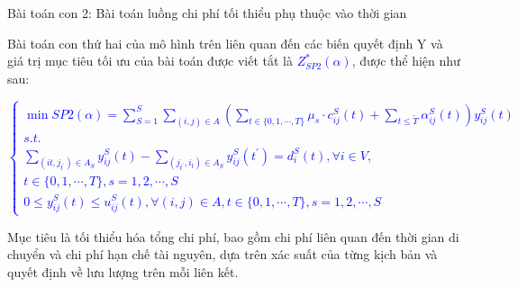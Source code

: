 \documentclass[a4paper]{article}
\begin{document}
Bài toán con 2: Bài toán luồng chi phí tối thiểu phụ thuộc vào thời gian 

Bài toán con thứ hai của mô hình trên liên quan đến các biến quyết định Y và giá trị mục tiêu tối ưu của bài toán được viết tắt là \textcolor{blue}{$Z^*_{SP2} (\alpha)$}, được thể hiện như sau: 

\textcolor{blue}{$\left\{\begin{array}{l}\min S P 2(\alpha)=\sum_{S=1}^S \sum_{(i, j) \in A}\left(\sum_{t \in\{0,1, \cdots, T\}} \mu_s \cdot c_{i j}^S(t)+\sum_{t \leqslant \widetilde{T}} \alpha_{i j}^S(t)\right) y_{i j}^S(t) \\ s . t . \\ \sum_{\left(i t, j_{t^{\prime}}\right) \in A_S} y_{i j}^S(t)-\sum_{\left(j_{t^{\prime}}, i_t\right) \in A_S} y_{i j}^S\left(t^{\prime}\right)=d_i^S(t), \forall i \in V, \\ t \in\{0,1, \cdots, T\}, s=1,2, \cdots, S \\ 0 \leqslant y_{i j}^S(t) \leqslant u_{i j}^S(t), \forall(i, j) \in A, t \in\{0,1, \cdots, T\}, s=1,2, \cdots, S\end{array}\right.$}

Mục tiêu là tối thiểu hóa tổng chi phí, bao gồm chi phí liên quan đến thời gian di chuyển và chi phí hạn chế tài nguyên, dựa trên xác suất của từng kịch bản và quyết định về lưu lượng trên mỗi liên kết. 
\end{document}
